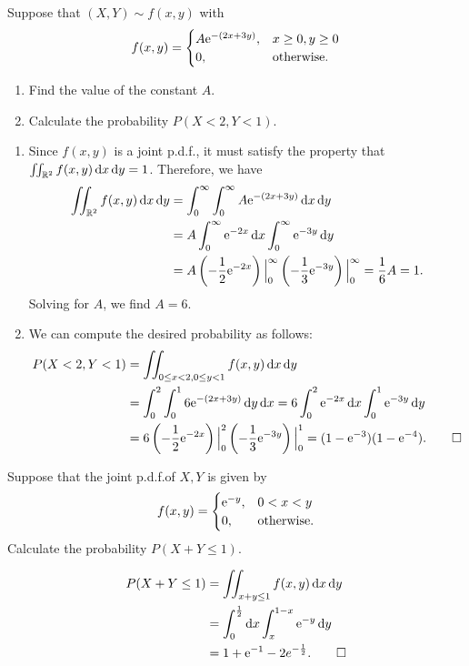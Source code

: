 \begin{example}
  Suppose that \((X, Y) \sim f(x, y)\) with
  \[
    f(x, y) = \begin{cases}
      A \mathrm{e}^{-(2x + 3y)}, & x \geq 0, y \geq 0 \\
      0, & \text{otherwise}.
    \end{cases}
  \]
  \begin{enumerate}
    \item Find the value of the constant \(A\).
    \item Calculate the probability \(P(X < 2, Y < 1)\).
  \end{enumerate}
\end{example}
\begin{solution}
  \begin{enumerate}
    \item Since \(f(x, y)\) is a joint p.d.f.\@, it must satisfy the property that \(\iint_{\mathbb{R}^2} f(x, y) \, \mathrm{d} x \, \mathrm{d} y = 1\). Therefore, we have
    \begin{align*}    
      \iint_{\mathbb{R}^2} f(x, y) \, \mathrm{d} x \, \mathrm{d} y &= \int_0^\infty \int_0^\infty A \mathrm{e}^{-(2x + 3y)} \, \mathrm{d} x \, \mathrm{d} y \\
      &= A \int_0^\infty \mathrm{e}^{-2x} \, \mathrm{d} x \int_0^\infty \mathrm{e}^{-3y} \, \mathrm{d} y \\
      &= A \left(-\frac{1}{2} \mathrm{e}^{-2x}\right)\Big|_0^\infty \left(-\frac{1}{3} \mathrm{e}^{-3y}\right)\Big|_0^\infty = \frac{1}{6} A = 1.
    \end{align*}
    Solving for \(A\), we find \(A = 6\).
    \item We can compute the desired probability as follows:
    \begin{align*}
      P(X < 2, Y < 1) &= \iint_{0 \leq x < 2, 0 \leq y < 1} f(x, y) \, \mathrm{d} x \, \mathrm{d} y \\
      &= \int_0^2 \int_0^1 6 \mathrm{e}^{-(2x + 3y)} \, \mathrm{d} y \, \mathrm{d} x = 6 \int_0^2 \mathrm{e}^{-2x} \, \mathrm{d} x \int_0^1 \mathrm{e}^{-3y} \, \mathrm{d} y \\
      &= 6 \left(-\frac{1}{2} \mathrm{e}^{-2x}\right)\Big|_0^2 \left(-\frac{1}{3} \mathrm{e}^{-3y}\right)\Big|_0^1 = (1 - \mathrm{e}^{-3})(1 - \mathrm{e}^{-4}). \qedhere
    \end{align*}
  \end{enumerate}
\end{solution}

\begin{example}
  Suppose that the joint p.d.f.\@ of \(X, Y\) is given by
  \[
    f(x, y) = \begin{cases}
      \mathrm{e}^{-y}, & 0 < x < y \\
      0, & \text{otherwise}.
    \end{cases}
  \]
  Calculate the probability \(P(X + Y \leq 1)\).
\end{example}
\begin{solution}
  \begin{align*}
    P(X + Y \leq 1) &= \iint_{x + y \leq 1} f(x, y) \, \mathrm{d} x \, \mathrm{d} y \\
    &= \int_0^\frac{1}{2} \mathrm{d} x \int_x^{1 - x} \mathrm{e}^{-y} \, \mathrm{d} y \\
    &= 1 + \mathrm{e}^{-1} - 2e^{-\frac{1}{2}}. \qedhere
  \end{align*}
\end{solution}


